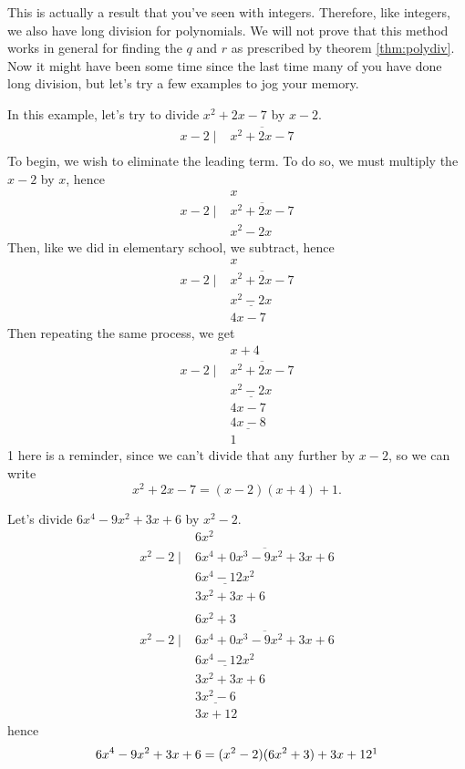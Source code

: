 This is actually a result that you've seen with integers.
Therefore, like integers, we also have long division for polynomials.
We will not prove that this method works in general for finding the $q$ and $r$ as prescribed by theorem \eqref{thm:polydiv}.
Now it might have been some time since the last time many of you have done long division, but let's try a few examples to jog your memory.
\begin{ex}
	In this example, let's try to divide $x^2+2x-7$ by $x-2$.
	\begin{align*}
		x-2 \mid &\overline{x^2+2x-7} \\
	\end{align*}
	To begin, we wish to eliminate the leading term. To do so, we must multiply the $x-2$ by $x$, hence
	\begin{align*}
		&x \\
		x-2 \mid &\overline{x^2+2x-7} \\
		&x^2-2x
	\end{align*}
	Then, like we did in elementary school, we subtract, hence
	\begin{align*}
		&x \\
		x-2 \mid &\overline{x^2+2x-7} \\
		&\underline{x^2-2x} \\
		&4x-7
	\end{align*}
	Then repeating the same process, we get
	\begin{align*}
		&x +4 \\
		x-2 \mid &\overline{x^2+2x-7} \\
		&\underline{x^2-2x} \\
		&4x-7 \\
		&\underline{4x-8} \\
		&1
	\end{align*}
	1 here is a reminder, since we can't divide that any further by $x-2$, so we can write
	$$x^2+2x-7=(x-2)(x+4)+1.$$
\end{ex}
\begin{ex}
	Let's divide $6x^4-9x^2+3x+6$ by $x^2-2$.
	\begin{align*}
				   & 6x^2 \\
		x^2-2 \mid & \overline{6x^4+0x^3-9x^2+3x+6} \\
		           & \underline{6x^4-12x^2} \\
		           & 3x^2+3x+6 \\
	\end{align*}
	\begin{align*}
				   & 6x^2 + 3\\
		x^2-2 \mid & \overline{6x^4+0x^3-9x^2+3x+6} \\
		           & \underline{6x^4-12x^2} \\
		           & 3x^2+3x+6 \\
		           & \underline{3x^2-6} \\
		           & 3x+12
	\end{align*}
	hence
	$$6x^4-9x^2+3x+6=(x^2-2)(6x^2+3)+3x+12\footnotemark$$
\end{ex}

